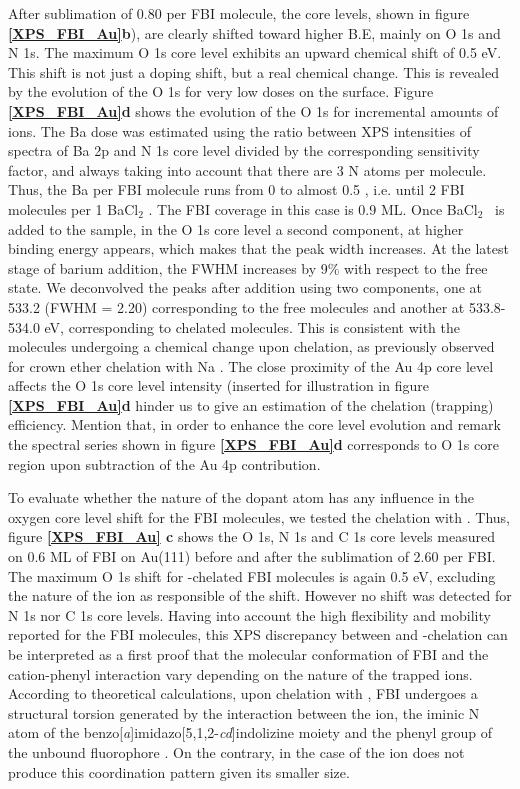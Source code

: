 \documentclass[aps,prl,reprint,longbibliography,superscriptaddress, english]{revtex4-1}
\def\BappCl{BaCl$_2$ }
\begin{document}
After sublimation of 0.80 \Bapp per FBI molecule, the core levels, shown in figure {\bf \ref{XPS_FBI_Au}b}), are clearly shifted toward higher B.E, mainly on O 1s and N 1s. The maximum O 1s core level exhibits an upward chemical shift of 0.5 eV. This shift is not just a doping shift, but a real chemical change. This is revealed by the evolution of the O 1s for very low \Bapp doses on the surface. Figure {\bf \ref{XPS_FBI_Au}d} shows the evolution of the O 1s for incremental {amounts} of \Bapp ions. The Ba dose was {estimated} using the ratio between XPS intensities of spectra of Ba 2p and N 1s core level divided by the {corresponding} sensitivity factor, and always taking into account that there are 3 N atoms per molecule. Thus, the Ba per FBI molecule runs from 0 to almost 0.5 , i.e. until 2 FBI {molecules} per 1 \BappCl. The FBI coverage in this case is 0.9 ML. Once \BappCl\ is added to the sample, in the O 1s core level a second component, at higher binding energy appears, which makes that the peak width increases. At the latest stage of barium addition, the FWHM increases by 9\% with respect to the free state. We {deconvolved} the peaks after \Bapp addition using two components, one at 533.2 (FWHM = 2.20) corresponding to the free molecules and another at 533.8-534.0 eV, corresponding to chelated molecules. This is consistent with the molecules undergoing a chemical change upon chelation, as previously observed for crown ether chelation with Na \cite{stredansky_-surface_2019}.  The close proximity of the Au 4p core level affects the O 1s core level intensity (inserted for illustration in figure {\bf \ref{XPS_FBI_Au}d} hinder us to give an estimation of the chelation (trapping) efficiency. Mention that, in order to enhance the core level evolution and remark the spectral {series} shown in figure {\bf \ref{XPS_FBI_Au}d} corresponds to O 1s core region upon subtraction of the Au 4p contribution. 

To evaluate whether the nature of the dopant atom has any influence in the oxygen core level shift for the FBI molecules, we tested the chelation with \Nap. Thus, figure {\bf \ref{XPS_FBI_Au} c} shows the O 1s, N 1s and C 1s core levels measured on 0.6 ML of FBI on Au(111) before and after the sublimation of 2.60 \Nap per FBI. The maximum O 1s shift for \Nap-chelated FBI molecules is again 0.5 eV, excluding the nature of the ion as responsible of the shift. However no shift was detected for N 1s nor C 1s core levels. Having into account the high flexibility and mobility reported for the FBI molecules, this XPS discrepancy between \Bapp\- and \Nap-chelation can be interpreted as a first {proof} that {the molecular conformation of FBI and the cation-phenyl interaction vary} depending on the nature of the trapped ions. According to theoretical calculations, upon chelation with \Bapp, {FBI undergoes a structural torsion generated by the} interaction between {the ion, the iminic N atom of the benzo[\textit{a}]imidazo[5,1,2-\textit{cd}]indolizine moiety and the phenyl group of the unbound fluorophore} \cite{rivilla_fluorescent_2020}. On the contrary, in the case of \Nap the ion does not produce {this coordination pattern}  given its smaller size. 
\end{document}
